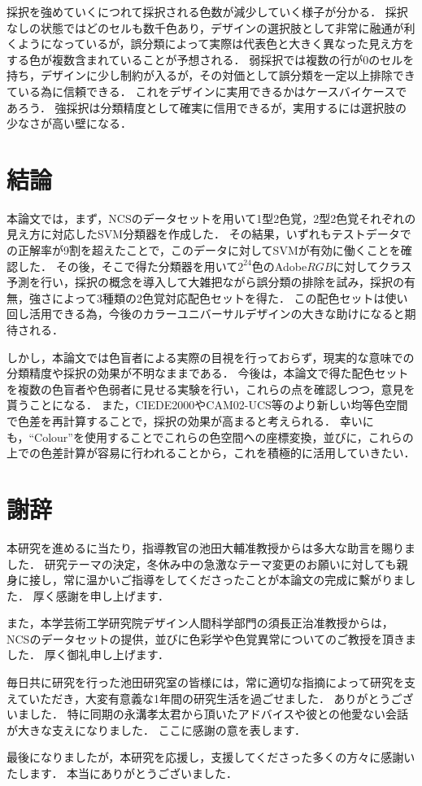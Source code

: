 \documentclass[uplatex,paper=a4,fontsize=4.0truemm,jafontsize=4.0truemm,head_space=30.0truemm,foot_space=30.0truemm,baselineskip=8.0truemm,line_length=40zw,gutter=25.0truemm,oneside,openany,fleqn,hanging_panctuation,open_bracket_pos=nibu_tentsuki,dvipdfmx,jis2004,book,titlepage]{jlreq}
\theoremstyle{mystyle}
\newcommand{\mathdisplaystyle}[1]{\(\displaystyle{#1}\)}
\begin{document}
				採択を強めていくにつれて採択される色数が減少していく様子が分かる．
				採択なしの状態ではどのセルも数千色あり，デザインの選択肢として非常に融通が利くようになっているが，誤分類によって実際は代表色と大きく異なった見え方をする色が複数含まれていることが予想される．
				弱採択では複数の行が0のセルを持ち，デザインに少し制約が入るが，その対価として誤分類を一定以上排除できている為に信頼できる．
				これをデザインに実用できるかはケースバイケースであろう．
				強採択は分類精度として確実に信用できるが，実用するには選択肢の少なさが高い壁になる．
	\chapter{結論}
		本論文では，まず，NCSのデータセットを用いて1型2色覚，2型2色覚それぞれの見え方に対応したSVM分類器を作成した．
		その結果，いずれもテストデータでの正解率が9割を超えたことで，このデータに対してSVMが有効に働くことを確認した．
		その後，そこで得た分類器を用いて\mathdisplaystyle{2^{24}}色のAdobe\mathdisplaystyle{RGB}に対してクラス予測を行い，採択の概念を導入して大雑把ながら誤分類の排除を試み，採択の有無，強さによって3種類の2色覚対応配色セットを得た．
		この配色セットは使い回し活用できる為，今後のカラーユニバーサルデザインの大きな助けになると期待される．

		しかし，本論文では色盲者による実際の目視を行っておらず，現実的な意味での分類精度や採択の効果が不明なままである．
		今後は，本論文で得た配色セットを複数の色盲者や色弱者に見せる実験を行い，これらの点を確認しつつ，意見を貰うことになる．
		また，CIEDE2000やCAM02-UCS等のより新しい均等色空間で色差を再計算することで，採択の効果が高まると考えられる．
		幸いにも，``Colour''を使用することでこれらの色空間への座標変換，並びに，これらの上での色差計算が容易に行われることから，これを積極的に活用していきたい．
	\chapter*{謝辞}
		本研究を進めるに当たり，指導教官の池田大輔准教授からは多大な助言を賜りました．
		研究テーマの決定，冬休み中の急激なテーマ変更のお願いに対しても親身に接し，常に温かいご指導をしてくださったことが本論文の完成に繫がりました．
		厚く感謝を申し上げます．

		また，本学芸術工学研究院デザイン人間科学部門の須長正治准教授からは，NCSのデータセットの提供，並びに色彩学や色覚異常についてのご教授を頂きました．
		厚く御礼申し上げます．

		毎日共に研究を行った池田研究室の皆様には，常に適切な指摘によって研究を支えていただき，大変有意義な1年間の研究生活を過ごせました．
		ありがとうございました．
		特に同期の永溝孝太君から頂いたアドバイスや彼との他愛ない会話が大きな支えになりました．
		ここに感謝の意を表します．

		最後になりましたが，本研究を応援し，支援してくださった多くの方々に感謝いたします．
		本当にありがとうございました．
	\clearpage
	
	
\end{document}
